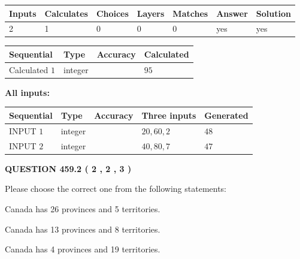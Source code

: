 \documentclass[12pt]{article}
\begin{document}
   
\noindent\begin{tabular}{|l|l|l|l|l|l|l|}
 \hline
Inputs & Calculates & Choices & Layers & Matches & Answer & Solution \\ \hline
 2  & 
 1  & 
 0
  & 
 0  & 
 0  & 
  yes & 
  yes 
  \\ \hline
 \end{tabular}
   
   
   
   
\noindent{}
   
   
  
  
\noindent\begin{tabular}{|l|l|l|l|}
\hline
 Sequential & Type & Accuracy & Calculated \\ 
\hline
 
 
  Calculated $  1 $ & integer &  & 
  $ 95 $ 
 \\  \hline  
 \end{tabular}
   
   
   
   
\noindent\vspace{0.1in}\hspace{-0.08in} {\textbf{\Large{All inputs: }}}
   
   
  
  
\noindent\begin{tabular}{|l|l|l|l|l|}
\hline
 Sequential & Type & Accuracy & Three inputs & Generated \\ 
\hline
 
 
  INPUT $  1 $ & integer &  & $
 20
 , 
 60
 , 
 2
 $ & $ 48 $ 
 \\  \hline  
 
 
  INPUT $  2 $ & integer &  & $
 40
 , 
 80
 , 
 7
 $ & $ 47 $ 
 \\  \hline  
 \end{tabular}
   
   
  
\vspace{0.2in}
  
{\textbf{\Large{QUESTION
459.2 
 ( 2 , 2 , 3 )
}}}
  
  
Please choose the correct one from the following statements:
 
 
Canada has  26 provinces and  5 territories.
 
 
Canada has  13 provinces and  8 territories.
 
 
Canada has   4 provinces and  19 territories.
 
\end{document}
